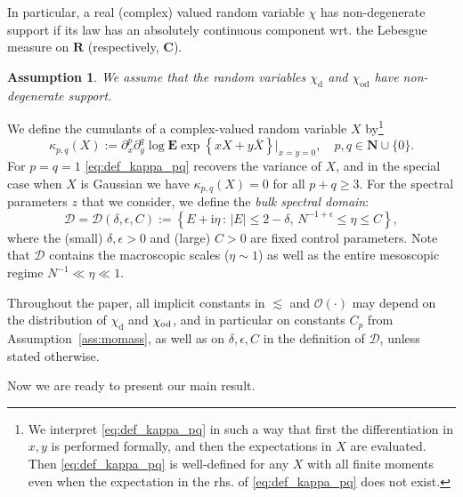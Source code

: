 \documentclass[10pt]{amsart}
\newtheorem{assumption}[theorem]{Assumption}
\numberwithin{equation}{section}
\newcommand{\dif}{\mathrm{d}}
\newcommand{\E}{\mathbf{E}}
\newcommand{\R}{\mathbf{R}}
\newcommand{\C}{\mathbf{C}}
\newcommand{\N}{\mathbf{N}}
\newcommand{\ii}{\mathrm{i}}
\begin{document}
In particular, a real (complex) valued random variable $\chi$ has non-degenerate support if its law has an absolutely continuous component wrt. the Lebesgue measure on $\R$ (respectively, $\C$).

\begin{assumption}\label{ass:support} We assume that the random variables $\chi_\dif$ and $\chi_{\mathrm{od}}$ have non-degenerate support.
\end{assumption}




We define the cumulants of a complex-valued random variable $X$ by\footnote{\label{ftn:kappa} We interpret \eqref{eq:def_kappa_pq} in such a way that first the differentiation in $x,y$ is performed formally, and then the expectations in $X$ are evaluated. Then \eqref{eq:def_kappa_pq} is well-defined for any $X$ with all finite moments even when the expectation in the rhs. of \eqref{eq:def_kappa_pq} does not exist.} 
\begin{equation}
\kappa_{p,q}(X):=\partial_{x}^p\partial_{y}^q \log \E \exp\left\lbrace xX + y\overline{X}\right\rbrace\big|_{x=y=0},\quad p,q\in \N\cup\{0\}.
\label{eq:def_kappa_pq}
\end{equation}
For $p=q=1$ \eqref{eq:def_kappa_pq} recovers the variance of $X$, and in the special case when $X$ is Gaussian we have $\kappa_{p,q}(X)=0$ for all $p+q\ge 3$. For the spectral parameters $z$ that we consider, we
define the \emph{bulk spectral domain}:
\begin{equation}
\mathcal{D}=\mathcal{D}(\delta,\epsilon,C):=\left\lbrace E+\ii\eta\,:\, |E|\le 2-\delta,\, N^{-1+\epsilon}\le \eta\le C\right\rbrace,
\label{eq:def_D}
\end{equation}
where the (small) $\delta, \epsilon>0$ and  (large) $C>0$ are fixed control parameters. Note that $\mathcal{D}$ contains the macroscopic scales ($\eta\sim 1$) as well as the entire mesoscopic regime $N^{-1}\ll \eta\ll 1$.

Throughout the paper, all implicit constants in $\lesssim $ and $\mathcal{O}(\cdot)$ may depend on the distribution of $\chi_\dif$ and $\chi_{\rm{od}}$, and in particular on constants $C_p$ from Assumption~\ref{ass:momass}, as well as on $\delta,\epsilon,C$ in the definition of $\mathcal{D}$, unless stated otherwise.



Now we are ready to present our main result. 
\end{document}
